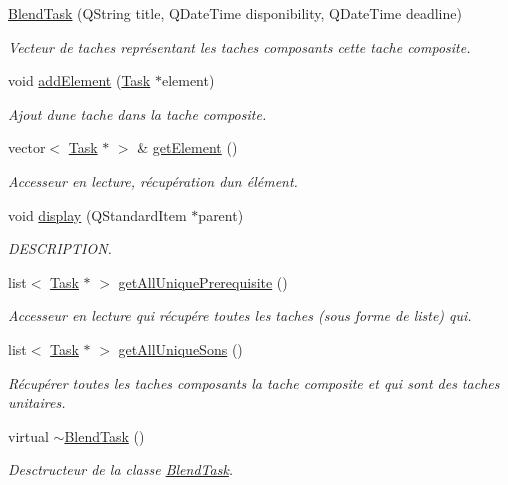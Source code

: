\begin{DoxyCompactItemize}
\item 
\hyperlink{class_blend_task_a61bf72da25e75729b4862d799a07a431}{Blend\+Task} (Q\+String title, Q\+Date\+Time disponibility, Q\+Date\+Time deadline)
\begin{DoxyCompactList}\small\item\em Vecteur de taches représentant les taches composants cette tache composite. \end{DoxyCompactList}\item 
void \hyperlink{class_blend_task_a3040fd67a2ce24fb0f35f2b3c67b04bd}{add\+Element} (\hyperlink{class_task}{Task} $\ast$element)
\begin{DoxyCompactList}\small\item\em Ajout d\textquotesingle{}une tache dans la tache composite. \end{DoxyCompactList}\item 
vector$<$ \hyperlink{class_task}{Task} $\ast$ $>$ \& \hyperlink{class_blend_task_ae93f227e61d7f371dcb0e1b08f7873cb}{get\+Element} ()
\begin{DoxyCompactList}\small\item\em Accesseur en lecture, récupération d\textquotesingle{}un élément. \end{DoxyCompactList}\item 
void \hyperlink{class_blend_task_a8ffd882e50a272a7b47544dcaf350410}{display} (Q\+Standard\+Item $\ast$parent)
\begin{DoxyCompactList}\small\item\em D\+E\+S\+C\+R\+I\+P\+T\+I\+O\+N. \end{DoxyCompactList}\item 
list$<$ \hyperlink{class_task}{Task} $\ast$ $>$ \hyperlink{class_blend_task_acab9d3efa1c415e50788b2bf763358c7}{get\+All\+Unique\+Prerequisite} ()
\begin{DoxyCompactList}\small\item\em Accesseur en lecture qui récupére toutes les taches (sous forme de liste) qui. \end{DoxyCompactList}\item 
list$<$ \hyperlink{class_task}{Task} $\ast$ $>$ \hyperlink{class_blend_task_a0495a8681c833baea0440e6bc1afd60d}{get\+All\+Unique\+Sons} ()
\begin{DoxyCompactList}\small\item\em Récupérer toutes les taches composants la tache composite et qui sont des taches unitaires. \end{DoxyCompactList}\item 
virtual \hyperlink{class_blend_task_a65b65d27cbfd5a0013bda2012e22b132}{$\sim$\+Blend\+Task} ()
\begin{DoxyCompactList}\small\item\em Desctructeur de la classe \hyperlink{class_blend_task}{Blend\+Task}. \end{DoxyCompactList}\end{DoxyCompactItemize}
